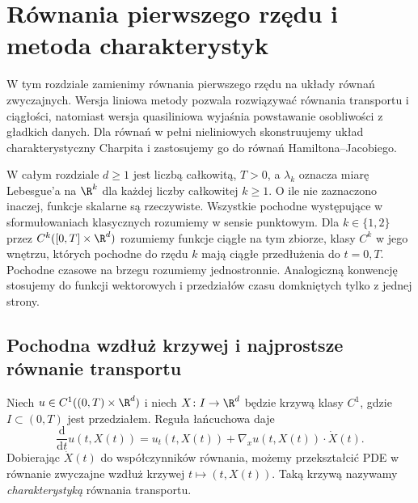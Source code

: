 \chapter[Charakterystyki i PDE pierwszego rzędu]{Równania pierwszego rzędu i metoda charakterystyk}
\label{chap:pde-characteristics}

W tym rozdziale zamienimy równania pierwszego rzędu na układy
równań zwyczajnych. Wersja liniowa metody pozwala rozwiązywać
równania transportu i ciągłości, natomiast wersja quasiliniowa
wyjaśnia powstawanie osobliwości z gładkich danych. Dla równań
w pełni nieliniowych skonstruujemy układ charakterystyczny
Charpita i zastosujemy go do równań Hamiltona--Jacobiego.

W całym rozdziale $d\geq1$ jest liczbą całkowitą,
$T>0$, a $\lambda_k$ oznacza miarę Lebesgue'a na $\R^k$
dla każdej liczby całkowitej $k\geq1$.
O ile nie zaznaczono inaczej, funkcje skalarne są
rzeczywiste. Wszystkie pochodne występujące
w sformułowaniach klasycznych rozumiemy w sensie punktowym.
Dla $k\in\{1,2\}$ przez $C^k([0,T]\times\R^d)$
rozumiemy funkcje ciągłe na tym zbiorze, klasy $C^k$
w jego wnętrzu, których pochodne do rzędu $k$ mają
ciągłe przedłużenia do $t=0,T$. Pochodne czasowe na
brzegu rozumiemy jednostronnie. Analogiczną konwencję
stosujemy do funkcji wektorowych i przedziałów czasu
domkniętych tylko z jednej strony.

\section{Pochodna wzdłuż krzywej i najprostsze równanie transportu}
\label{sec:pde2-basic}

Niech $u\in C^1((0,T)\times\R^d)$ i niech
$X\colon I\to\R^d$ będzie krzywą klasy $C^1$, gdzie
$I\subset(0,T)$ jest przedziałem. Reguła łańcuchowa daje
\begin{equation}\label{eq:pde2-chain}
 \frac{\mathrm d}{\mathrm dt}u(t,X(t))
 =u_t(t,X(t))+\nabla_xu(t,X(t))\cdot\dot X(t).
\end{equation}
Dobierając $\dot X(t)$ do współczynników równania,
możemy przekształcić PDE w równanie zwyczajne
wzdłuż krzywej $t\mapsto(t,X(t))$. Taką krzywą nazywamy
\emph{charakterystyką} równania transportu.

